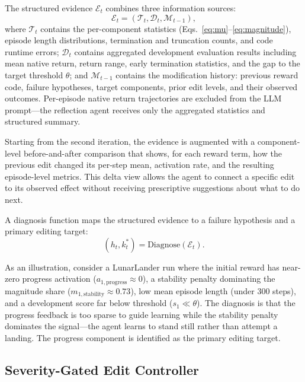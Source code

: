 \documentclass[letterpaper,twocolumn,10pt]{article}
\begin{document}
The structured evidence $\mathcal{E}_t$ combines three information sources:
\begin{equation}
\mathcal{E}_t = (\mathcal{T}_t, \mathcal{D}_t, \mathcal{M}_{t-1}),
\label{eq:feedback}
\end{equation}
where $\mathcal{T}_t$ contains the per-component statistics (Eqs.~\ref{eq:mu}--\ref{eq:magnitude}), episode length distributions, termination and truncation counts, and code runtime errors; $\mathcal{D}_t$ contains aggregated development evaluation results including mean native return, return range, early termination statistics, and the gap to the target threshold $\theta$; and $\mathcal{M}_{t-1}$ contains the modification history: previous reward code, failure hypotheses, target components, prior edit levels, and their observed outcomes. Per-episode native return trajectories are excluded from the LLM prompt---the reflection agent receives only the aggregated statistics and structured summary.

Starting from the second iteration, the evidence is augmented with a component-level before-and-after comparison that shows, for each reward term, how the previous edit changed its per-step mean, activation rate, and the resulting episode-level metrics. This delta view allows the agent to connect a specific edit to its observed effect without receiving prescriptive suggestions about what to do next.

A diagnosis function maps the structured evidence to a failure hypothesis and a primary editing target:
\begin{equation}
(h_t, k_t^*) = \text{Diagnose}(\mathcal{E}_t).
\label{eq:diagnosis}
\end{equation}

As an illustration, consider a LunarLander run where the initial reward has near-zero progress activation ($a_{1,\text{progress}} \approx 0$), a stability penalty dominating the magnitude share ($m_{1,\text{stability}} \approx 0.73$), low mean episode length (under 300 steps), and a development score far below threshold ($s_1 \ll \theta$). The diagnosis is that the progress feedback is too sparse to guide learning while the stability penalty dominates the signal---the agent learns to stand still rather than attempt a landing. The progress component is identified as the primary editing target.

\subsection{Severity-Gated Edit Controller}
\end{document}
